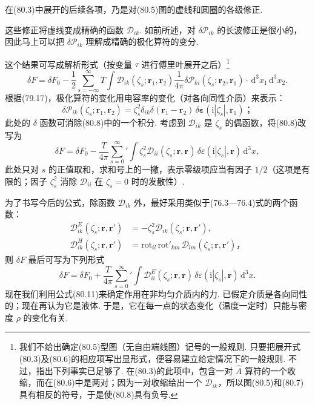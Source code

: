 在(80.3)中展开的后续各项，乃是对(80.5)图的虚线和圆圈的各级修正.

这些修正将虚线变成精确的函数 $\mathcal{D}_{ik}$. 如前所述，对 $\delta\mathcal{P}_{ik}$ 的长波修正是很小的，因此马上可以把 $\delta\mathcal{P}_{ik}$ 理解成精确的极化算符的变分.

这个结果可写成解析形式（按变量 $\tau$ 进行傅里叶展开之后）\footnote{我们不给出确定(80.5)型图（无自由端线图）记号的一般规则. 只要把展开式(80.3)及(80.6)的相应项写出显形式，便容易建立给定情况下的一般规则. 不过，指出下列事实已足够了. 在(80.3)的此项中，包含一对 $\hat{A}$ 算符的一个收缩，而在(80.6)中是两对；因为一对收缩给出一个 $\mathcal{D}_{ik}$，所以图(80.5)和(80.7)具有相反的符号，于是使(80.8)具有负号.}
\begin{equation}
  \delta F=\delta F_0-\frac{1}{2}\sum_{s=-\infty}^{\infty}T\int\mathcal{D}_{ik}(\zeta_s;\bm{r}_1,\bm{r}_2)\frac{1}{4\pi}\delta\mathcal{P}_{ki}(\zeta_s;\bm{r}_2,\bm{r}_1)\cdot\,\mathrm{d}^{3}x_1\,\mathrm{d}^{3}x_2.
\end{equation}
根据(79.17)，极化算符的变化用电容率的变化（对各向同性介质）来表示：
\begin{equation*}
  \delta\mathcal{P}_{ik}(\zeta_s;\bm{r}_1,\bm{r}_2)=\zeta_s^{2}\delta_{ik}\delta(\bm{r}_1-\bm{r}_2)\,\delta\bm{\varepsilon}(\mathrm{i}|\zeta_s|,\bm{r}_1)\text{；}
\end{equation*}
此处的 $\delta$ 函数可消除(80.8)中的一个积分. 考虑到 $\mathcal{D}_{ik}$ 是 $\zeta_s$ 的偶函数，将(80.8)改写为
\begin{equation}
  \delta F=\delta F_0-\frac{T}{4\pi}\sum_{s=0}^{\infty}{}'\int\zeta_s^{2}\mathcal{D}_{ii}(\zeta_s;\bm{r},\bm{r})\,\delta\varepsilon(\mathrm{i}|\zeta_s|,\bm{r})\,\mathrm{d}^{3}x,
\end{equation}
此处只对 $s$ 的正值取和，求和号上的一撇，表示零级项应当有因子 $1/2$（这项是有限的；因子 $\zeta_s^{2}$ 消除 $\mathcal{D}_{ii}$ 在 $\zeta_s=0$ 时的发散性）.

为了书写今后的公式，除函数 $\mathcal{D}_{ik}$ 外，最好采用类似于(76.3—76.4)式的两个函数：
\begin{equation}
  \begin{aligned}
    \mathcal{D}^{E}_{ik}(\zeta_s;\bm{r},\bm{r}')&=-\zeta_s^{2}\mathcal{D}_{ik}(\zeta_s;\bm{r},\bm{r}'),\\
    \mathcal{D}^{H}_{ik}(\zeta_s;\bm{r},\bm{r}')&=\mathrm{rot}_{il}\,\mathrm{rot}'_{km}\,\mathcal{D}_{lm}(\zeta_s;\bm{r},\bm{r}')\text{，}
  \end{aligned}
\end{equation}
则 $\delta F$ 最后可写为下列形式
\begin{equation}
  \delta F=\delta F_0+\frac{T}{4\pi}\sum_{s=0}^{\infty}{}'\int\mathcal{D}^{E}_{ii}(\zeta_s;\bm{r},\bm{r})\,\delta\varepsilon(\mathrm{i}|\zeta_s|,\bm{r})\,\mathrm{d}^{3}x.
\end{equation}
现在我们利用公式(80.11)来确定作用在非均匀介质内的力. 已假定介质是各向同性的；现在再认为它是液体. 于是，它在每一点的状态变化（温度一定时）只能与密度 $\rho$ 的变化有关.

